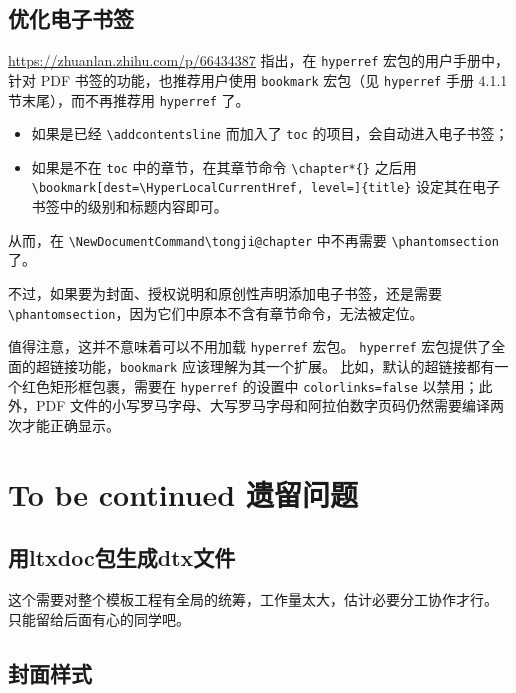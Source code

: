 \documentclass[../Main/thesis.tex]{subfiles}
\begin{document}
\subsection{优化电子书签}

\url{https://zhuanlan.zhihu.com/p/66434387} 指出，在 \texttt{hyperref}
宏包的用户手册中，针对 PDF 书签的功能，也推荐用户使用 \texttt{bookmark}
宏包（见 \texttt{hyperref} 手册 4.1.1 节末尾），而不再推荐用
\texttt{hyperref} 了。

\begin{itemize}
\item
  如果是已经 \texttt{\textbackslash{}addcontentsline} 而加入了
  \texttt{toc} 的项目，会自动进入电子书签；
\item
  如果是不在 \texttt{toc} 中的章节，在其章节命令
  \texttt{\textbackslash{}chapter*\{\}} 之后用
  \texttt{\textbackslash{}bookmark{[}dest=\textbackslash{}HyperLocalCurrentHref,\ level={]}\{title\}}
  设定其在电子书签中的级别和标题内容即可。
\end{itemize}

从而，在
\texttt{\textbackslash{}NewDocumentCommand\textbackslash{}tongji@chapter}
中不再需要 \texttt{\textbackslash{}phantomsection} 了。

不过，如果要为封面、授权说明和原创性声明添加电子书签，还是需要
\texttt{\textbackslash{}phantomsection}，因为它们中原本不含有章节命令，无法被定位。

值得注意，这并不意味着可以不用加载 \texttt{hyperref} 宏包。
\texttt{hyperref} 宏包提供了全面的超链接功能，\texttt{bookmark}
应该理解为其一个扩展。 比如，默认的超链接都有一个红色矩形框包裹，需要在
\texttt{hyperref} 的设置中 \texttt{colorlinks=false} 以禁用；此外，PDF
文件的小写罗马字母、大写罗马字母和阿拉伯数字页码仍然需要编译两次才能正确显示。

\section{To be continued
遗留问题}

\subsection{用ltxdoc包生成dtx文件}

这个需要对整个模板工程有全局的统筹，工作量太大，估计必要分工协作才行。
只能留给后面有心的同学吧。

\subsection{封面样式}
\end{document}
